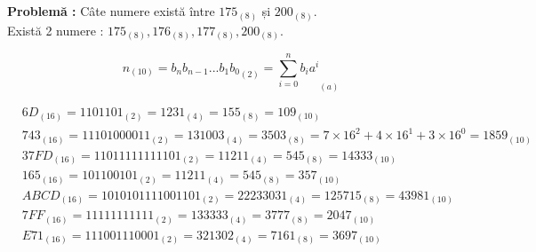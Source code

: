 \documentclass[12pt]{article}
\begin{document}
\textbf{Problemă :}
Câte numere există între $175_{(8)}$ și $200_{(8)}$.\\
Există 2 numere : $175_{(8)}, 176_{(8)}, 177_{(8)}, 200_{(8)}$.

\begin{equation}
    n_{(10)}={b_{n}b_{n-1}...b_{1}b_{0}}_{(2)}={\sum_{i=0}^{n}b_{i}a^{i}}_{(a)}
\end{equation}

\begin{align*}
    & 6D_{(16)}=1101101_{(2)}=1231_{(4)}=155_{(8)}=109_{(10)}\\
    & 743_{(16)}=11101000011_{(2)}=131003_{(4)}=3503_{(8)}=7\times 16^2 + 4 \times 16^1 +3 \times 16^0 = 1859_{(10)}\\
    & 37FD_{(16)}=11011111111101_{(2)}=11211_{(4)}=545_{(8)}=14333_{(10)}\\
    & 165_{(16)}=101100101_{(2)}=11211_{(4)}=545_{(8)}=357_{(10)}\\
    & ABCD_{(16)}=1010101111001101_{(2)}=22233031_{(4)}=125715_{(8)}=43981_{(10)}\\
    & 7FF_{(16)}=11111111111_{(2)}=133333_{(4)}=3777_{(8)}=2047_{(10)}\\
    & E71_{(16)}=111001110001_{(2)}=321302_{(4)}=7161_{(8)}=3697_{(10)}\\
\end{align*}
\end{document}
